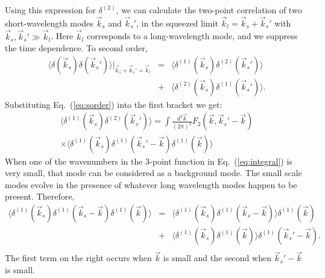 \documentclass[prd,amsmath,amssymb,floatfix,superscriptaddress,nofootinbib,twocolumn]{revtex4-1}
\def\be{\begin{equation}}
\def\ee{\end{equation}}
\def\bea{\begin{eqnarray}}
\def\eea{\end{eqnarray}}
\newcommand{\vs}{\nonumber\\}
\newcommand{\vk}{\vec{k}}
\newcommand{\ec}[1]{Eq.~(\ref{eq:#1})}
\newcommand{\eql}[1]{\label{eq:#1}}
\newcommand{\peikai}[1]{{\color{blue} #1}}
\begin{document}
Using this expression for $\delta^{(2)}$, we can calculate the two-point correlation of two short-wavelength modes $\vk_s$ and $\vk_s'$, in the squeezed limit $\vk_l=\vk_s+\vk_s'$ with $\vk_s,\vk_s' \gg \vk_l$. Here $\vk_l$ corresponds to a long-wavelength mode, and we suppress the time dependence. To second order,
\bea 
 \langle {\delta}(\vec{k}_s){\delta}(\vec{k}_s') \rangle|_{\vk_s+\vk_s'=\vk_l}&=&
  \langle {\delta}^{(1)}(\vec{k}_s){\delta}^{(2)}(\vec{k}_s') \rangle\vs
  &+&\langle {\delta}^{(2)}(\vec{k}_s){\delta}^{(1)}(\vec{k}_s') \rangle.
\eea 
Substituting \ec{sorder} into the first bracket we get:
\bea 
\langle {\delta}^{(1)}(\vec{k}_s){\delta}^{(2)}(\vec{k}_s') \rangle =  \int \frac{d^3\vec{k}}{(2\pi)^3} F_2 (\vec{k},\vec{k}_s'-\vec{k})\vs
\times \langle {\delta}^{(1)}(\vec{k}_s){\delta}^{(1)}(\vec{k}_s'-\vec{k}){\delta}^{(1)}(\vec{k}) \rangle \eql{integral}
\eea 
When one of the wavenumbers in the 3-point function in \ec{integral} is very small, that mode can be considered as a background mode. The small scale modes evolve in the presence of whatever long wavelength modes happen to be present. Therefore, 
\bea
\langle
\delta^{(1)}(\vk_{s}) \delta^{(1)}(\vk_{s}-\vk){\delta^{(1)}}(\vk) 
\rangle
&=&\langle {\delta^{(1)}}(\vk_{s}) {\delta^{(1)}}(\vk_{s}-\vk) \rangle {\delta^{(1)}}(\vk)  \vs
&+&\langle {\delta^{(1)}}(\vk_{s}) {\delta^{(1)}}(\vk) \rangle {\delta^{(1)}}(\vk_s'-\vk) .
\vs
\eql{contraction}
\eea
The first term on the right occurs when $\vk$ is small and the second when $\vk_s'-\vk$ is small.
\end{document}
